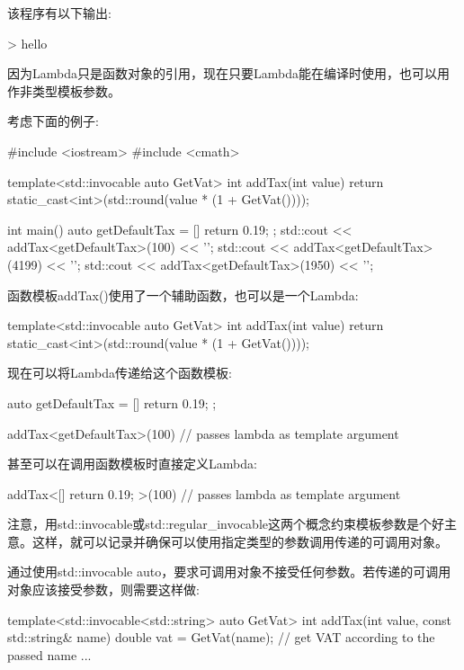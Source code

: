 该程序有以下输出:

\begin{shell}
> hello
\end{shell}


因为Lambda只是函数对象的引用，现在只要Lambda能在编译时使用，也可以用作非类型模板参数。

考虑下面的例子:


\begin{cpp}
#include <iostream>
#include <cmath>

template<std::invocable auto GetVat>
int addTax(int value)
{
	return static_cast<int>(std::round(value * (1 + GetVat())));
}

int main()
{
	auto getDefaultTax = [] {
		return 0.19;
	};
	std::cout << addTax<getDefaultTax>(100) << '\n';
	std::cout << addTax<getDefaultTax>(4199) << '\n';
	std::cout << addTax<getDefaultTax>(1950) << '\n';
}
\end{cpp}

函数模板addTax()使用了一个辅助函数，也可以是一个Lambda:

\begin{cpp}
template<std::invocable auto GetVat>
int addTax(int value)
{
	return static_cast<int>(std::round(value * (1 + GetVat())));
}
\end{cpp}

现在可以将Lambda传递给这个函数模板:

\begin{cpp}
auto getDefaultTax = [] {
	return 0.19;
};

addTax<getDefaultTax>(100) // passes lambda as template argument
\end{cpp}

甚至可以在调用函数模板时直接定义Lambda:

\begin{cpp}
addTax<[]{ return 0.19; }>(100) // passes lambda as template argument
\end{cpp}

注意，用std::invocable或std::regular\_invocable这两个概念约束模板参数是个好主意。这样，就可以记录并确保可以使用指定类型的参数调用传递的可调用对象。

通过使用std::invocable auto，要求可调用对象不接受任何参数。若传递的可调用对象应该接受参数，则需要这样做:

\begin{cpp}
template<std::invocable<std::string> auto GetVat>
int addTax(int value, const std::string& name)
{
	double vat = GetVat(name); // get VAT according to the passed name
	...
}
\end{cpp}

